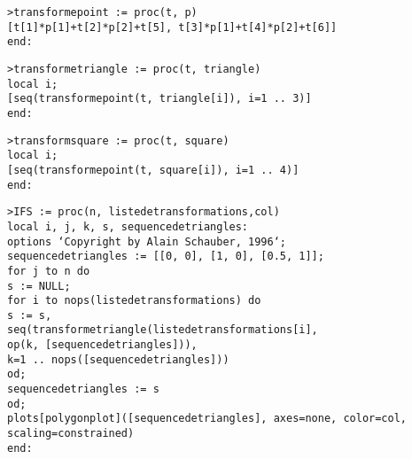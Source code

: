 	\texttt{>transforme\textunderscore point := proc(t, p)}\\
    \texttt{[t[1]*p[1]+t[2]*p[2]+t[5], t[3]*p[1]+t[4]*p[2]+t[6]]}\\
	\texttt{end:}

	\texttt{>transforme\textunderscore triangle := proc(t, triangle)}\\
    \texttt{local i;}\\
    \texttt{[seq(transforme\textunderscore point(t, triangle[i]), i=1 .. 3)]}\\
  	\texttt{end:}

  	\texttt{>transform\textunderscore square := proc(t, square)}\\
    \texttt{local i;}\\
    \texttt{[seq(transforme\textunderscore point(t, square[i]), i=1 .. 4)]}\\
	\texttt{end:}

	\texttt{>IFS := proc(n, liste\textunderscore de\textunderscore transformations,col)}\\
     \texttt{local i, j, k, s, sequence\textunderscore de\textunderscore triangles:}\\
     \texttt{options `Copyright by Alain Schauber, 1996`;}\\
     \texttt{sequence\textunderscore de\textunderscore triangles := [[0, 0], [1, 0], [0.5, 1]];}\\
     \texttt{for j to n do}\\
     \texttt{s := NULL;}\\
     \texttt{for i to nops(liste\textunderscore de\textunderscore transformations) do}\\
        \texttt{s := s,}\\
        \texttt{seq(transforme\textunderscore triangle(liste\textunderscore de\textunderscore transformations[i],}\\
        \texttt{op(k, [sequence\textunderscore de\textunderscore triangles])),}\\
        \texttt{k=1 .. nops([sequence\textunderscore de\textunderscore triangles]))}\\
       \texttt{od;}\\
      \texttt{sequence\textunderscore de\textunderscore triangles := s}\\
     \texttt{od;}\\
    \texttt{plots[polygonplot]([sequence\textunderscore de\textunderscore triangles], axes=none, color=col, scaling=constrained)}\\
  \texttt{end:}

